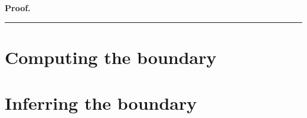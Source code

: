 \documentclass{tufte-handout}
\newenvironment{pf}[1][Proof]{\textbf{#1.} }{\ \rule{0.5em}{0.5em}}
\begin{document}
\begin{pf}
	\end{pf}
	
	
	\section{Computing the boundary}
	
	\section{Inferring the boundary}
	
\end{document}
